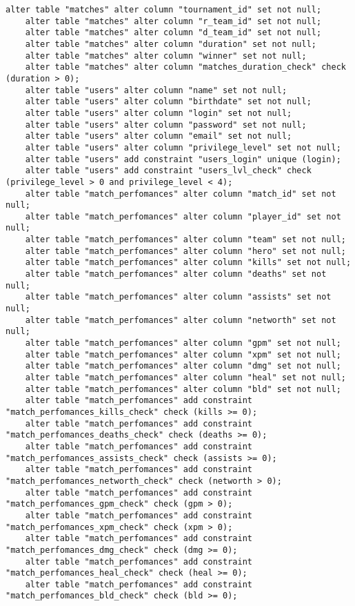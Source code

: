 \begin{appendices}
\begin{lstlisting}[caption={Сценарий создания ограничений в базе данных (часть 4)}]
	alter table "matches" alter column "tournament_id" set not null;
	alter table "matches" alter column "r_team_id" set not null;
	alter table "matches" alter column "d_team_id" set not null;
	alter table "matches" alter column "duration" set not null;
	alter table "matches" alter column "winner" set not null;
	alter table "matches" alter column "matches_duration_check" check (duration > 0);
	alter table "users" alter column "name" set not null;
	alter table "users" alter column "birthdate" set not null;
	alter table "users" alter column "login" set not null;
	alter table "users" alter column "password" set not null;
	alter table "users" alter column "email" set not null;
	alter table "users" alter column "privilege_level" set not null;
	alter table "users" add constraint "users_login" unique (login);
	alter table "users" add constraint "users_lvl_check" check (privilege_level > 0 and privilege_level < 4);
	alter table "match_perfomances" alter column "match_id" set not null;
	alter table "match_perfomances" alter column "player_id" set not null;
	alter table "match_perfomances" alter column "team" set not null;
	alter table "match_perfomances" alter column "hero" set not null;
	alter table "match_perfomances" alter column "kills" set not null;
	alter table "match_perfomances" alter column "deaths" set not null;
	alter table "match_perfomances" alter column "assists" set not null;
	alter table "match_perfomances" alter column "networth" set not null;
	alter table "match_perfomances" alter column "gpm" set not null;
	alter table "match_perfomances" alter column "xpm" set not null;
	alter table "match_perfomances" alter column "dmg" set not null;
	alter table "match_perfomances" alter column "heal" set not null;
	alter table "match_perfomances" alter column "bld" set not null;
	alter table "match_perfomances" add constraint "match_perfomances_kills_check" check (kills >= 0);
	alter table "match_perfomances" add constraint "match_perfomances_deaths_check" check (deaths >= 0);
	alter table "match_perfomances" add constraint "match_perfomances_assists_check" check (assists >= 0);
	alter table "match_perfomances" add constraint "match_perfomances_networth_check" check (networth > 0);
	alter table "match_perfomances" add constraint "match_perfomances_gpm_check" check (gpm > 0);
	alter table "match_perfomances" add constraint "match_perfomances_xpm_check" check (xpm > 0);
	alter table "match_perfomances" add constraint "match_perfomances_dmg_check" check (dmg >= 0);
	alter table "match_perfomances" add constraint "match_perfomances_heal_check" check (heal >= 0);
	alter table "match_perfomances" add constraint "match_perfomances_bld_check" check (bld >= 0);
\end{lstlisting}


\end{appendices}
